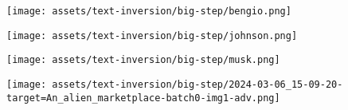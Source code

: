 \begin{figure*}[h]
\begin{minipage}[t]{0.98\figwidth}
    \vspace{0pt}
    \begin{subfigure}[t]{0.25\columnwidth}
        \texttt{[image: assets/text-inversion/big-step/bengio.png]}
    \end{subfigure}%
    \begin{subfigure}[t]{0.25\columnwidth}
        \texttt{[image: assets/text-inversion/big-step/johnson.png]}
    \end{subfigure}%
    \begin{subfigure}[t]{0.25\columnwidth}
        \texttt{[image: assets/text-inversion/big-step/musk.png]}
    \end{subfigure}%
    \begin{subfigure}[t]{0.25\columnwidth}
        \texttt{[image: assets/text-inversion/big-step/2024-03-06\_15-09-20-target=An\_alien\_marketplace-batch0-img1-adv.png]}
    \end{subfigure}%
\end{minipage}



\end{figure*}
